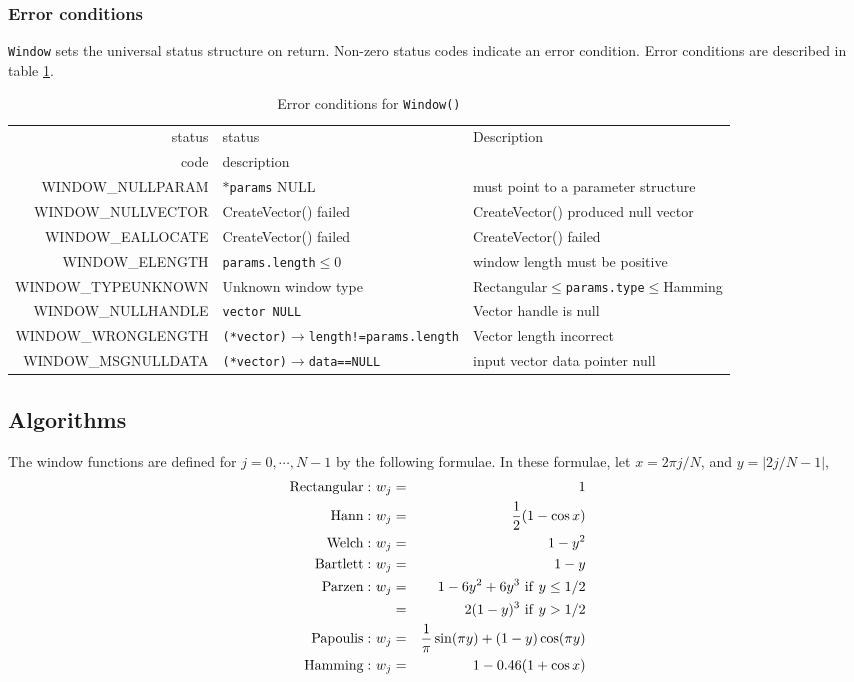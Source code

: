 \documentclass{article}
\begin{document}
\subsubsection{Error conditions}


{\tt Window\/}
sets the universal status structure on return. Non-zero status codes
indicate an error condition. Error conditions are described in
table \ref{tbl:WI}.

\begin{table}
\hskip -0.7in
\begin{tabular}{|r|l|l|}\hline
status&status&Description\\
code&description&\\\hline
WINDOW\_NULLPARAM&$*${\tt params} NULL&must point to a parameter structure\\
WINDOW\_NULLVECTOR&CreateVector() failed&CreateVector() produced null vector\\
WINDOW\_EALLOCATE&CreateVector() failed &CreateVector() failed\\
WINDOW\_ELENGTH&{\tt params.length}$\le 0$&window length must be positive\\
WINDOW\_TYPEUNKNOWN&Unknown window type&Rectangular$\le${\tt params.type}$\le$Hamming\\
WINDOW\_NULLHANDLE&{\tt *vector NULL}&Vector handle is null\\
WINDOW\_WRONGLENGTH&{\tt (*vector)$\rightarrow$length!=params.length}&Vector length incorrect\\
WINDOW\_MSGNULLDATA&{\tt (*vector)$\rightarrow$data==NULL}&input vector data pointer null\\
\hline
\end{tabular}
\caption{Error conditions for {\tt Window()}}\label{tbl:WI}
\end{table}

                                
\subsection{Algorithms}

The window functions are defined for $j=0,\cdots,N-1$ by the following formulae.
In these formulae, let $x=2 \pi j/N$, and $y=|2j/N-1|$,
\begin{eqnarray*}
{\rm Rectangular:\ } w_j &=& 1 \\
{\rm Hann:\ } w_j &=& {1 \over 2} ( 1 - \cos  x  ) \\
{\rm Welch:\ } w_j &=& 1 -  y^2 \\
{\rm Bartlett:\ } w_j &=& 1 -  y \\
{\rm Parzen:\ } w_j &=&  1 - 6 y^2 + 6 y^3  {\rm\ if\ } y\le 1/2\\
                    &=&  2 (1-y)^3 {\rm\ if\ } y>1/2\\
{\rm Papoulis:\ } w_j &=& {1 \over \pi} \sin (\pi  y  ) + ( 1 -  y  ) \cos (\pi  y  )\\
{\rm Hamming:\ } w_j &=& 1-0.46 (1 + \cos x ) \\
\end{eqnarray*}
\end{document}

